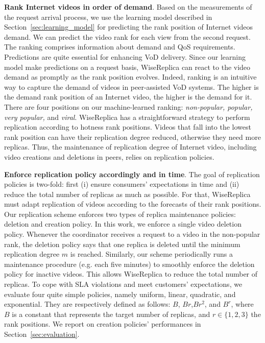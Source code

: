 \noindent
\textbf{Rank Internet videos in order of demand}. Based on the measurements of the request arrival process, we use the learning model described in Section~\ref{sec:learning_model} for predicting the rank position of Internet videos demand. We can predict the video rank for each view from the second request. The ranking comprises information about demand and QoS requirements. Predictions are quite essential for enhancing VoD delivery. Since our learning model make predictions on a request basis, WiseReplica can react to the video demand as promptly as the rank position evolves. Indeed, ranking is an intuitive way to capture the demand of videos in peer-assisted VoD systems. The higher is the demand rank position of an Internet video, the higher is the demand for it. There are four positions on our machine-learned ranking: \emph{non-popular, popular, very popular,} and \emph{viral}. WiseReplica has a straightforward strategy to perform replication according to hotness rank positions. Videos that fall into the lowest rank position can have their replication degree reduced, otherwise they need more replicas. Thus, the maintenance of replication degree of Internet video, including video creations and deletions in peers, relies on replication policies.

\noindent
\textbf{Enforce replication policy accordingly and in time}. The goal of replication policies is two-fold: first (i) ensure consumers' expectations in time and (ii) reduce the total number of replicas as much as possible. For that, WiseReplica must adapt replication of videos according to the forecasts of their rank positions. Our replication scheme enforces two types of replica maintenance policies: deletion and creation policy. In this work, we enforce a single video deletion policy.  Whenever the coordinator receives a request to a video in the non-popular rank, the deletion policy says that one replica is deleted until the minimum replication degree $m$ is reached. Similarly, our scheme periodically runs a maintenance procedure (e.g. each five minutes) to smoothly enforce the deletion policy for inactive videos. This allows WiseReplica to reduce the total number of replicas. To cope with SLA violations and meet customers' expectations, we evaluate four quite simple policies, namely uniform, linear, quadratic, and exponential. They are respectively defined as follows: $B$, $Br$,$Br^2$, and $B^r$, where $B$ is a constant that represents the target number of replicas, and $r \in \{1,2,3\}$ the rank positions. We report on creation policies' performances in Section~\ref{sec:evaluation}.


